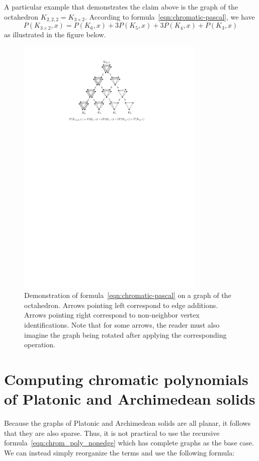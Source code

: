 A particular example that demonstrates the claim above is the graph of the octahedron $K_{2,2,2} = K_{3 \times 2}$. According to formula~\ref{eqn:chromatic-pascal}, we have \[ P(K_{3 \times 2},x) = P(K_6,x)+3P(K_5,x) + 3P(K_4,x)+P(K_3,x)\] as illustrated in the figure below.

\begin{figure}[H]
    \centering
    \includegraphics[width=0.8\textwidth]{Resources/Figs/octahedral_pascal_demo.pdf}
    \caption{Demonstration of formula~\ref{eqn:chromatic-pascal} on a graph of the octahedron. Arrows pointing left correspond to edge additions. Arrows pointing right correspond to non-neighbor vertex identifications. Note that for some arrows, the reader must also imagine the graph being rotated after applying the corresponding operation.}
\end{figure}

\section{Computing chromatic polynomials of Platonic and Archimedean solids}\label{sec:comp-chrompolys}

Because the graphs of Platonic and Archimedean solids are all planar, it follows that they are also sparse. Thus, it is not practical to use the recursive formula~\ref{eqn:chrom_poly_nonedge} which has complete graphs as the base case. We can instead simply reorganize the terms and use the following formula:

